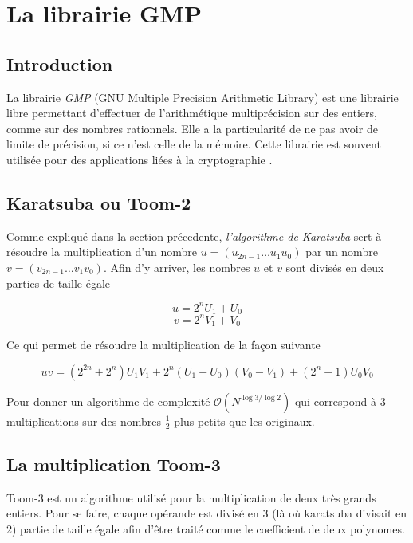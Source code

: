 \documentclass[letterpaper]{article}
\begin{document}
\section{La librairie GMP}
\subsection{Introduction}

La librairie \emph{GMP} (GNU Multiple Precision Arithmetic Library) est une
librairie libre permettant d'effectuer de l'arithmétique multiprécision sur
des entiers, comme sur des nombres rationnels. Elle a la particularité de ne pas
avoir de limite de précision, si ce n'est celle de la mémoire.
\newline
Cette librairie est souvent utilisée pour des applications liées à la
cryptographie \cite{wikigmp}.

\subsection{Karatsuba ou Toom-2}

Comme expliqué dans la section précedente, \emph{l'algorithme de Karatsuba} sert
à résoudre la multiplication d'un nombre $u = (u_{2n-1} \dots u_1 u_0)$ par un
nombre $v = (v_{2n-1} \dots v_1 v_0)$. Afin d'y arriver, les nombres $u$ et $v$
sont divisés en deux parties de taille égale

  $$u = 2^{n} U_1 + U_0$$
  $$v = 2^{n} V_1 + V_0$$

Ce qui permet de résoudre la multiplication de la façon suivante

  $$uv = (2^{2n} + 2^n) U_1 V_1 + 2^n (U_1 - U_0) (V_0 - V_1) + (2^n + 1) U_0 V_0$$

Pour donner un algorithme de complexité $\mathcal{O}(N^{\log{3}/\log{2}})$ qui
correspond à $3$ multiplications sur des nombres $\frac{1}{2}$ plus petits que
les originaux\cite{gmplibkaratsuba}.

\subsection{La multiplication Toom-3}

Toom-3 est un algorithme utilisé pour la multiplication de deux très grands
entiers. Pour se faire, chaque opérande est divisé en 3 (là où karatsuba
divisait en 2) partie de taille égale afin d'être traité comme le
coefficient de deux polynomes\cite{gmplib2014}.
\end{document}
